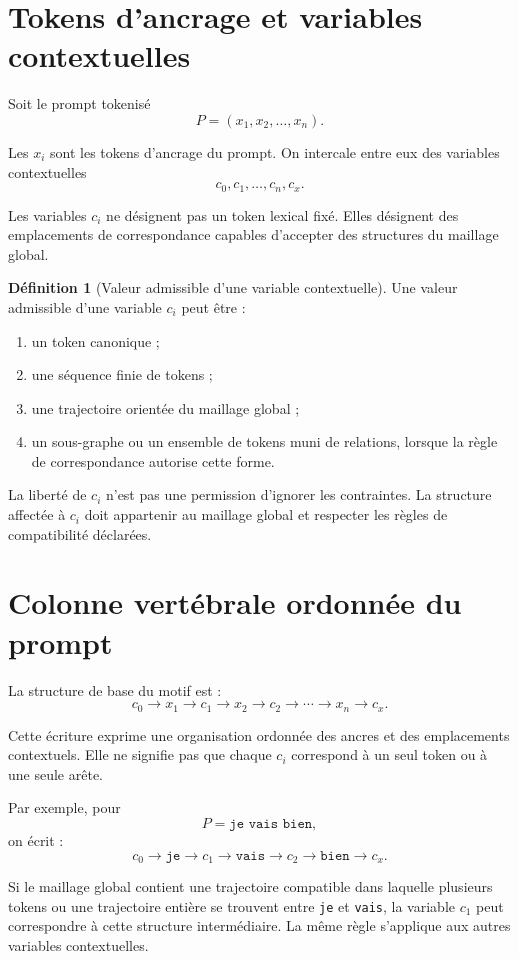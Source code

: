 \documentclass[11pt,a4paper]{report}
\theoremstyle{definition}
\newtheorem{definition}{Définition}[chapter]
\theoremstyle{plain}
\theoremstyle{remark}
\begin{document}
\section{Tokens d'ancrage et variables contextuelles}

Soit le prompt tokenisé
\[
P=(x_1,x_2,\ldots,x_n).
\]

Les \(x_i\) sont les tokens d'ancrage du prompt. On intercale
entre eux des variables contextuelles
\[
c_0,c_1,\ldots,c_n,c_x.
\]

Les variables \(c_i\) ne désignent pas un token lexical fixé.
Elles désignent des emplacements de correspondance capables
d'accepter des structures du maillage global.

\begin{definition}[Valeur admissible d'une variable contextuelle]
Une valeur admissible d'une variable \(c_i\) peut être :
\begin{enumerate}[label=\alph*)]
  \item un token canonique ;
  \item une séquence finie de tokens ;
  \item une trajectoire orientée du maillage global ;
  \item un sous-graphe ou un ensemble de tokens muni de relations,
        lorsque la règle de correspondance autorise cette forme.
\end{enumerate}
\end{definition}

La liberté de \(c_i\) n'est pas une permission d'ignorer les
contraintes. La structure affectée à \(c_i\) doit appartenir au
maillage global et respecter les règles de compatibilité
déclarées.

\section{Colonne vertébrale ordonnée du prompt}

La structure de base du motif est :
\[
c_0\to x_1\to c_1\to x_2\to c_2
\to\cdots\to x_n\to c_x.
\]

Cette écriture exprime une organisation ordonnée des ancres et
des emplacements contextuels. Elle ne signifie pas que chaque
\(c_i\) correspond à un seul token ou à une seule arête.

Par exemple, pour
\[
P=\texttt{je vais bien},
\]
on écrit :
\[
c_0\to\texttt{je}\to c_1
\to\texttt{vais}\to c_2
\to\texttt{bien}\to c_x.
\]

Si le maillage global contient une trajectoire compatible dans
laquelle plusieurs tokens ou une trajectoire entière se trouvent
entre \texttt{je} et \texttt{vais}, la variable \(c_1\) peut
correspondre à cette structure intermédiaire. La même règle
s'applique aux autres variables contextuelles.
\end{document}
